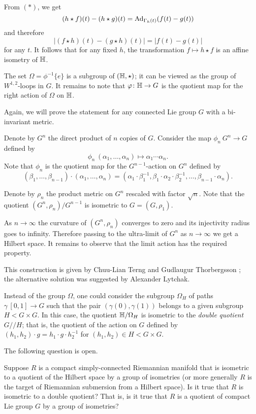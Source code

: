 From $({*})$, we get
\[(h\star f)(t)-(h\star g)(t)=\mathrm{Ad}_{\Gamma_h(t)}(f(t)-g(t))\]
and therefore
\[|(f\star h)(t)-(g\star h)(t)|=|f(t)-g(t)|\]
for any $t$.
It follows that for any fixed $h$,
the transformation $f\mapsto h\star f$ is an affine isometry of $\mathbb{H}$.


The set $\Omega=\phi^{-1}\{e\}$ is a subgroup of $(\mathbb{H},\star)$;
it can be viewed as the group of $W^{1,2}$-loops in $G$.
It remains to note that $\varphi\colon\mathbb{H}\to G$ is the quotient map for the right action of $\Omega$ on $\mathbb{H}$.
\qeds

 Again, we will prove the statement for any connected Lie group $G$ with a bi-invariant metric.

Denote by $G^n$ the direct product of $n$ copies of $G$.
Consider the map $\phi_n\:G^n\to G$ defined by
\[\phi_n\:(\alpha_1,\dots,\alpha_n)\mapsto \alpha_1\cdots\alpha_n.\]
Note that $\phi_n$ is the quotient map for the $G^{n-1}$-action on $G^n$ defined by
\[(\beta_1,\dots,\beta_{n-1})\cdot(\alpha_1,\dots,\alpha_n)=(\alpha_1\cdot\beta_1^{-1},\beta_1\cdot\alpha_2\cdot\beta_2^{-1},\dots,\beta_{n-1}\cdot\alpha_n).\]

Denote by $\rho_n$ the product metric on $G^n$ rescaled with factor $\sqrt{n}$.
Note that the quotient $(G^n,\rho_n)/G^{n-1}$ is isometric to $G=(G,\rho_1)$.

As $n\to\infty$ the curvature of $(G^n,\rho_n)$ converges to zero and its injectivity radius goes to infinity.
Therefore passing to the ultra-limit of $G^n$ as $n\to\infty$ we get a Hilbert space.
It remains to observe that the limit action has the required property.
\qeds

This construction is given by Chuu-Lian Terng and Gudlaugur Thorbergsson \cite[see section 4 in][]{terng-thorbergsson};
the alternative solution was suggested by Alexander Lytchak.

Instead of the group $\Omega$, 
one could consider the subgroup $\Omega_H$ of paths $\gamma\:[0,1]\to G$ such that the pair $(\gamma(0),\gamma(1))$ belongs to a given subgroup $H<G\times G$.
In this case, the quotient $\mathbb{H}/\Omega_H$ is isometric to the \emph{double quotient} $G/\!\!/H$;
that is, the quotient of the action on $G$ defined by $(h_1,h_2)\cdot g=h_1\cdot g\cdot h_2^{-1}$ for $(h_1,h_2)\in H<G\times G$.


The following question is open.

\begin{pr} Suppose $R$ is a compact simply-connected Riemannian manifold that is isometric to a quotient of the Hilbert space by a group of isometries (or more generally $R$ is the target of Riemannian submersion from a Hilbert space).
Is it true that $R$ is isometric to a double quotient? That is, is it true that $R$ is a quotient of compact Lie group $G$ by a group of isometries?
 
\end{pr}
